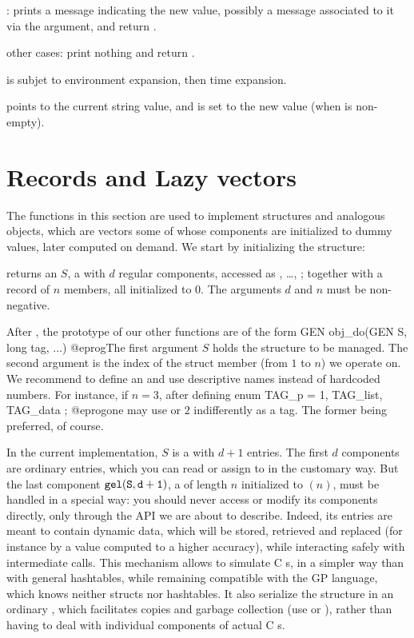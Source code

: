 \item {}: prints a message indicating the new value,
possibly a message associated to it via the  argument, and return
.

\item other cases: print nothing and return .

\item {} is subjet to environment expansion, then time expansion.

\item {} points to the current string value, and is set to the new
value (when  is non-empty).

\section{Records and Lazy vectors}
The functions in this section are used to implement  structures and
analogous objects, which are vectors some of whose components are initialized
to dummy values, later computed on demand. We start by initializing the
structure:

 returns an  $S$, a 
with $d$ regular components, accessed as , \dots,
; together with a record of $n$ members, all initialized to
$0$. The arguments $d$ and $n$ must be non-negative.

After , the prototype of our other functions are of
the form
\bprog
  GEN obj_do(GEN S, long tag, ...)
@eprog\noindent The first argument $S$ holds the structure to be managed.
The second argument  is the index of the struct member (from $1$ to
$n$) we operate on. We recommend to define an  and use descriptive
names instead of hardcoded numbers. For instance, if $n = 3$, after defining
\bprog
  enum { TAG_p = 1, TAG_list, TAG_data };
@eprog\noindent one may use  or $2$ indifferently as a tag.
The former being preferred, of course.

In the current implementation, $S$ is a  with $d+1$ entries.
The first $d$ components are ordinary  entries, which you can
read or assign to in the customary way. But the last component ${\tt gel(S,
d+1)}$, a  of length $n$ initialized to $(n)$, must
be handled in a special way: you should never access or modify its components
directly, only through the API we are about to describe. Indeed, its entries
are meant to contain dynamic data, which will be stored, retrieved and
replaced (for instance by a value computed to a higher accuracy), while
interacting safely with intermediate  calls. This mechanism
allows to simulate C s, in a simpler way than with general
hashtables, while remaining compatible with the GP language, which knows
neither structs nor hashtables. It also serialize the structure in an
ordinary , which facilitates copies and garbage collection (use
 or ), rather than having to deal with individual
components of actual C s.


